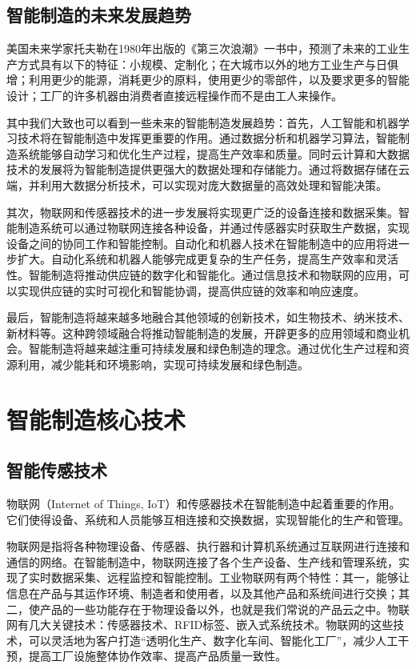 \documentclass[lang=cn,12pt,bibtex,newtx,twoside,margintrue,citestyle=gb7714-2015, bibstyle=gb7714-2015]{elegantbook}
\begin{document}
\subsection{智能制造的未来发展趋势}
\label{sec:orgf00b0f0}
美国未来学家托夫勒在1980年出版的《第三次浪潮》一书中\cite{托夫勒2006}，预测了未来的工业生产方式具有以下的特征：小规模、定制化；在大城市以外的地方工业生产与日俱增；利用更少的能源，消耗更少的原料，使用更少的零部件，以及要求更多的智能设计；工厂的许多机器由消费者直接远程操作而不是由工人来操作。

其中我们大致也可以看到一些未来的智能制造发展趋势：首先，人工智能和机器学习技术将在智能制造中发挥更重要的作用。通过数据分析和机器学习算法，智能制造系统能够自动学习和优化生产过程，提高生产效率和质量。同时云计算和大数据技术的发展将为智能制造提供更强大的数据处理和存储能力。通过将数据存储在云端，并利用大数据分析技术，可以实现对庞大数据量的高效处理和智能决策。

其次，物联网和传感器技术的进一步发展将实现更广泛的设备连接和数据采集。智能制造系统可以通过物联网连接各种设备，并通过传感器实时获取生产数据，实现设备之间的协同工作和智能控制。自动化和机器人技术在智能制造中的应用将进一步扩大。自动化系统和机器人能够完成更复杂的生产任务，提高生产效率和灵活性。智能制造将推动供应链的数字化和智能化。通过信息技术和物联网的应用，可以实现供应链的实时可视化和智能协调，提高供应链的效率和响应速度。

最后，智能制造将越来越多地融合其他领域的创新技术，如生物技术、纳米技术、新材料等。这种跨领域融合将推动智能制造的发展，开辟更多的应用领域和商业机会。智能制造将越来越注重可持续发展和绿色制造的理念。通过优化生产过程和资源利用，减少能耗和环境影响，实现可持续发展和绿色制造。

\section{智能制造核心技术}
\label{sec:org6b50d0a}
\subsection{智能传感技术}
\label{sec:org708845b}
物联网（Internet of Things, IoT）和传感器技术在智能制造中起着重要的作用。它们使得设备、系统和人员能够互相连接和交换数据，实现智能化的生产和管理。

物联网是指将各种物理设备、传感器、执行器和计算机系统通过互联网进行连接和通信的网络。在智能制造中，物联网连接了各个生产设备、生产线和管理系统，实现了实时数据采集、远程监控和智能控制。工业物联网有两个特性：其一，能够让信息在产品与其运作环境、制造者和使用者，以及其他产品和系统间进行交换；其二，使产品的一些功能存在于物理设备以外，也就是我们常说的产品云之中。物联网有几大关键技术：传感器技术、RFID标签、嵌入式系统技术。物联网的这些技术，可以灵活地为客户打造“透明化生产、数字化车间、智能化工厂”，减少人工干预，提高工厂设施整体协作效率、提高产品质量一致性。
\end{document}
